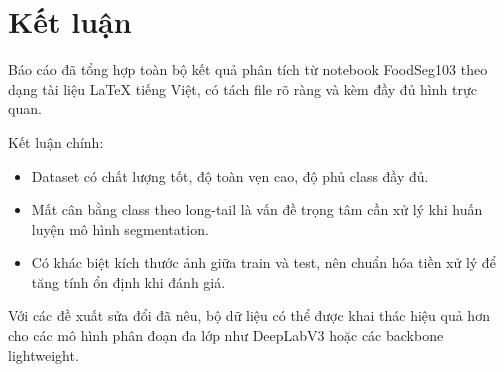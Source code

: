 \section{Kết luận}

Báo cáo đã tổng hợp toàn bộ kết quả phân tích từ notebook FoodSeg103 theo dạng tài liệu LaTeX tiếng Việt, có tách file rõ ràng và kèm đầy đủ hình trực quan.

Kết luận chính:
\begin{itemize}[leftmargin=1.5em]
    \item Dataset có chất lượng tốt, độ toàn vẹn cao, độ phủ class đầy đủ.
    \item Mất cân bằng class theo long-tail là vấn đề trọng tâm cần xử lý khi huấn luyện mô hình segmentation.
    \item Có khác biệt kích thước ảnh giữa train và test, nên chuẩn hóa tiền xử lý để tăng tính ổn định khi đánh giá.
\end{itemize}

Với các đề xuất sửa đổi đã nêu, bộ dữ liệu có thể được khai thác hiệu quả hơn cho các mô hình phân đoạn đa lớp như DeepLabV3 hoặc các backbone lightweight.